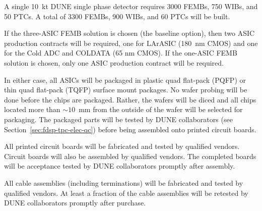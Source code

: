 A single 10~kt DUNE single phase detector requires 3000 FEMBs, 750 WIBs, and 50 PTCs.  A total of 3300 FEMBs, 900 WIBs, and 60 PTCs will be built.

If the three-ASIC FEMB solution is chosen (the baseline option), then two ASIC production contracts will be required, one for LArASIC (180~nm CMOS) and one for the Cold ADC and COLDATA (65 nm CMOS).  If the one-ASIC FEMB solution is chosen, only one ASIC production contract will be required.

In either case, all ASICs will be packaged in plastic quad flat-pack (PQFP) or thin quad flat-pack (TQFP) surface mount packages.  No wafer probing will be done before the chips are packaged.  Rather, the wafers will be diced and all chips located more than $\sim10$~mm from the outside of the wafer will be selected for packaging.  The packaged parts will be tested by DUNE collaborators (see Section~\ref{sec:fdsp-tpc-elec-qc}) before being assembled onto printed circuit boards.

All printed circuit boards will be fabricated and tested by qualified vendors. Circuit boards will also be assembled by qualified vendors.  The completed boards will be acceptance tested by DUNE collaborators promptly after assembly.

All cable assemblies (including terminations) will be fabricated and tested by qualified vendors.  At least a fraction of the cable assemblies will be retested by DUNE collaborators promptly after purchase.

